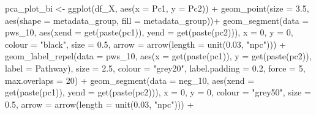 \documentclass[
  letterpaper,
]{book}
\newenvironment{Shaded}{}{}
\newcommand{\AttributeTok}[1]{\textcolor[rgb]{0.84,0.23,0.29}{#1}}
\newcommand{\DecValTok}[1]{\textcolor[rgb]{0.00,0.36,0.77}{#1}}
\newcommand{\FloatTok}[1]{\textcolor[rgb]{0.00,0.36,0.77}{#1}}
\newcommand{\FunctionTok}[1]{\textcolor[rgb]{0.44,0.26,0.76}{#1}}
\newcommand{\NormalTok}[1]{\textcolor[rgb]{0.14,0.16,0.18}{#1}}
\newcommand{\OtherTok}[1]{\textcolor[rgb]{0.44,0.26,0.76}{#1}}
\newcommand{\SpecialCharTok}[1]{\textcolor[rgb]{0.00,0.36,0.77}{#1}}
\newcommand{\StringTok}[1]{\textcolor[rgb]{0.01,0.18,0.38}{#1}}
\begin{document}
\begin{Shaded}
\begin{Highlighting}[]
\NormalTok{    pca\_plot\_bi }\OtherTok{\textless{}{-}} \FunctionTok{ggplot}\NormalTok{(df\_X, }\FunctionTok{aes}\NormalTok{(}\AttributeTok{x =}\NormalTok{ Pc1, }\AttributeTok{y =}\NormalTok{ Pc2)) }\SpecialCharTok{+}
      \FunctionTok{geom\_point}\NormalTok{(}\AttributeTok{size =} \FloatTok{3.5}\NormalTok{, }\FunctionTok{aes}\NormalTok{(}\AttributeTok{shape =}\NormalTok{ metadata\_group, }\AttributeTok{fill =}\NormalTok{ metadata\_group))}\SpecialCharTok{+}
      \FunctionTok{geom\_segment}\NormalTok{(}\AttributeTok{data =}\NormalTok{ pws\_10,}
                   \FunctionTok{aes}\NormalTok{(}\AttributeTok{xend =} \FunctionTok{get}\NormalTok{(}\FunctionTok{paste}\NormalTok{(pc1)), }\AttributeTok{yend =} \FunctionTok{get}\NormalTok{(}\FunctionTok{paste}\NormalTok{(pc2))),}
                   \AttributeTok{x =} \DecValTok{0}\NormalTok{, }\AttributeTok{y =} \DecValTok{0}\NormalTok{, }\AttributeTok{colour =} \StringTok{"black"}\NormalTok{,}
                   \AttributeTok{size =} \FloatTok{0.5}\NormalTok{,}
                   \AttributeTok{arrow =} \FunctionTok{arrow}\NormalTok{(}\AttributeTok{length =} \FunctionTok{unit}\NormalTok{(}\FloatTok{0.03}\NormalTok{, }\StringTok{"npc"}\NormalTok{))) }\SpecialCharTok{+}
      \FunctionTok{geom\_label\_repel}\NormalTok{(}\AttributeTok{data =}\NormalTok{ pws\_10,}
                   \FunctionTok{aes}\NormalTok{(}\AttributeTok{x =} \FunctionTok{get}\NormalTok{(}\FunctionTok{paste}\NormalTok{(pc1)), }\AttributeTok{y =} \FunctionTok{get}\NormalTok{(}\FunctionTok{paste}\NormalTok{(pc2)), }\AttributeTok{label =}\NormalTok{ Pathway),}
                   \AttributeTok{size =} \FloatTok{2.5}\NormalTok{, }\AttributeTok{colour =} \StringTok{"grey20"}\NormalTok{, }\AttributeTok{label.padding =} \FloatTok{0.2}\NormalTok{, }\AttributeTok{force =} \DecValTok{5}\NormalTok{, }\AttributeTok{max.overlaps =} \DecValTok{20}\NormalTok{) }\SpecialCharTok{+}
      \FunctionTok{geom\_segment}\NormalTok{(}\AttributeTok{data =}\NormalTok{ neg\_10,}
                   \FunctionTok{aes}\NormalTok{(}\AttributeTok{xend =} \FunctionTok{get}\NormalTok{(}\FunctionTok{paste}\NormalTok{(pc1)), }\AttributeTok{yend =} \FunctionTok{get}\NormalTok{(}\FunctionTok{paste}\NormalTok{(pc2))),}
                   \AttributeTok{x =} \DecValTok{0}\NormalTok{, }\AttributeTok{y =} \DecValTok{0}\NormalTok{, }\AttributeTok{colour =} \StringTok{"grey50"}\NormalTok{,}
                   \AttributeTok{size =} \FloatTok{0.5}\NormalTok{,}
                   \AttributeTok{arrow =} \FunctionTok{arrow}\NormalTok{(}\AttributeTok{length =} \FunctionTok{unit}\NormalTok{(}\FloatTok{0.03}\NormalTok{, }\StringTok{"npc"}\NormalTok{))) }\SpecialCharTok{+}

\end{Highlighting}
\end{Shaded}
\end{document}
